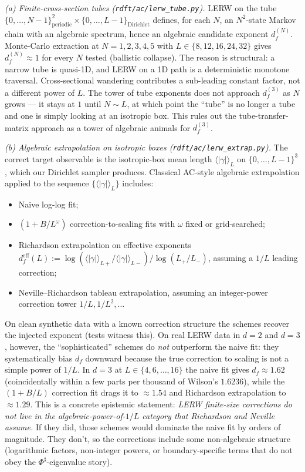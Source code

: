 \documentclass[10pt,a4paper,twocolumn]{article}
\theoremstyle{plain}
\theoremstyle{definition}
\begin{document}
\emph{(a) Finite-cross-section tubes
(\texttt{rdft/ac/lerw\_tube.py}).}
LERW on the tube $\{0, \dots, N-1\}^2_{\text{periodic}} \times
\{0, \dots, L-1\}_{\text{Dirichlet}}$ defines, for each $N$, an
$N^2$-state Markov chain with an algebraic spectrum, hence an
algebraic candidate exponent $d_f^{(N)}$.  Monte-Carlo extraction
at $N = 1, 2, 3, 4, 5$ with $L \in \{8, 12, 16, 24, 32\}$ gives
$d_f^{(N)} \approx 1$ for every $N$ tested (ballistic collapse).
The reason is structural: a narrow tube is quasi-1D, and LERW on
a 1D path is a deterministic monotone traversal.  Cross-sectional
wandering contributes a sub-leading constant factor, not a
different power of $L$.  The tower of tube exponents does not
approach $d_f^{(3)}$ as $N$ grows --- it stays at $1$ until
$N \sim L$, at which point the ``tube'' is no longer a tube and
one is simply looking at an isotropic box.  This rules out the
tube-transfer-matrix approach as a tower of algebraic animals
for $d_f^{(3)}$.

\emph{(b) Algebraic extrapolation on isotropic boxes
(\texttt{rdft/ac/lerw\_extrap.py}).}
The correct target observable is the isotropic-box mean length
$\langle|\gamma|\rangle_L$ on $\{0, \dots, L-1\}^3$, which our
Dirichlet sampler produces.  Classical AC-style algebraic
extrapolation applied to the sequence
$\{\langle|\gamma|\rangle_L\}$ includes:
\begin{itemize}[leftmargin=*]
\item Naive log-log fit;
\item $(1 + B/L^\omega)$ correction-to-scaling fits with $\omega$
  fixed or grid-searched;
\item Richardson extrapolation on effective exponents
  $d_f^{\text{eff}}(L) := \log(\langle|\gamma|\rangle_{L+}/
  \langle|\gamma|\rangle_{L-}) / \log(L_+ / L_-)$, assuming a
  $1/L$ leading correction;
\item Neville--Richardson tableau extrapolation, assuming an
  integer-power correction tower $1/L, 1/L^2, \dots$
\end{itemize}
On clean synthetic data with a known correction structure the
schemes recover the injected exponent (tests witness this).  On
real LERW data in $d = 2$ and $d = 3$, however, the
``sophisticated'' schemes do \emph{not} outperform the naive fit:
they systematically bias $d_f$ downward because the true
correction to scaling is not a simple power of $1/L$.  In $d = 3$
at $L \in \{4, 6, \dots, 16\}$ the naive fit gives $d_f \approx
1.62$ (coincidentally within a few parts per thousand of Wilson's
$1.6236$), while the $(1 + B/L)$ correction fit drags it to
$\approx 1.54$ and Richardson extrapolation to $\approx 1.29$.
This is a concrete epistemic statement: \emph{LERW finite-size
corrections do not live in the algebraic-power-of-$1/L$ category
that Richardson and Neville assume.}  If they did, those schemes
would dominate the naive fit by orders of magnitude.  They don't,
so the corrections include some non-algebraic structure
(logarithmic factors, non-integer powers, or boundary-specific
terms that do not obey the $\Phi^\sharp$-eigenvalue story).
\end{document}
